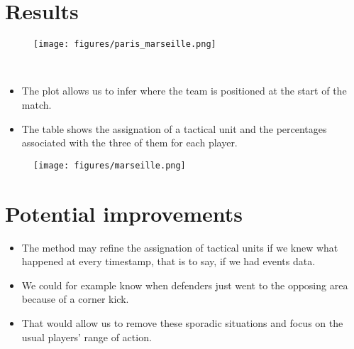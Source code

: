 \documentclass{beamer}
\begin{document}
\section{Results}
\begin{frame}{}

\begin{minipage}{0.3\textwidth} 
\begin{figure}[H]
\begin{center}
\vspace*{0.2cm}\texttt{[image: figures/paris\_marseille.png]}
\end{center}
\end{figure} 
\end{minipage}
\   \
\hfill \begin{minipage}{6cm}
\vspace*{-0.1cm}
\begin{itemize}
\scriptsize
\item The plot allows us to infer where the team is positioned at the start of the match.
\item The table shows the assignation of a tactical unit and the percentages associated with the three of them for each player.
\end{itemize}
\end{minipage}

\begin{figure}[H]
\vspace*{-0.5cm}
\texttt{[image: figures/marseille.png]}
\end{figure}

\end{frame}

\section{Potential improvements}
\begin{frame}{}

\begin{itemize}
\footnotesize
\item The method may refine the assignation of tactical units if we knew what happened at every timestamp, that is to say, if we had events data. 

\vspace*{0.6cm}

\item We could for example know when defenders just went to the opposing area because of a corner kick. 

\vspace*{0.6cm}

\item That would allow us to remove these sporadic situations and focus on the usual players' range of action. 
\end{itemize}

\end{frame}
\end{document}
